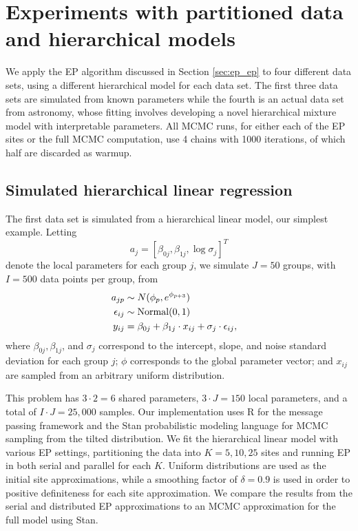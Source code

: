\section{Experiments with partitioned data and hierarchical models}
\label{sec:ep_application}

We apply the EP algorithm discussed in Section \ref{sec:ep_ep} to four different data sets, using a different hierarchical model for each data set. The first three data sets are simulated from known parameters while the fourth is an actual data set from astronomy, whose fitting involves developing a novel hierarchical mixture model with interpretable parameters. All MCMC runs, for either each of the EP sites or the full MCMC computation, use 4 chains with 1000 iterations, of which half are discarded as warmup.

\subsection{Simulated hierarchical linear regression}
\label{subsec:ep_application_linear}

The first data set is simulated from a hierarchical linear model, our simplest example. Letting
$$ a_j = [\beta_{0j}, \beta_{1j}, \log \sigma_j]^T$$
denote the local parameters for each group $j$, we simulate $J = 50$ groups, with $I = 500$ data points per group, from
\begin{align}
a_{jp} &\sim N(\phi_p, e^{ \phi_{p+3} } ) && \\\nonumber
\epsilon_{ij} &\sim \text{Normal}(0,1) && \\\nonumber
y_{ij} &= \beta_{0j} + \beta_{1j} \cdot x_{ij} + \sigma_j \cdot \epsilon_{ij},
\end{align}
where $\beta_{0j}, \beta_{1j}$, and $\sigma_j$ correspond to the intercept, slope, and noise standard deviation for each group $j$; $\phi$ corresponds to the global parameter vector; and $x_{ij}$ are sampled from an arbitrary uniform distribution.

This problem has $3 \cdot 2 = 6$ shared parameters, $3 \cdot J = 150$ local parameters, and a total of $I \cdot J = 25,000$ samples. Our implementation uses R for the message passing framework and the Stan probabilistic modeling language \citep{Stan:2016} for MCMC sampling from the tilted distribution. We fit the hierarchical linear model with various EP settings, partitioning the data into $K = 5, 10, 25$ sites and running EP in both serial and parallel for each $K$. Uniform distributions are used as the initial site approximations, while a smoothing factor of $\delta=0.9$ is used in order to positive definiteness for each site approximation. We compare the results from the serial and distributed EP approximations to an MCMC approximation for the full model using Stan.

